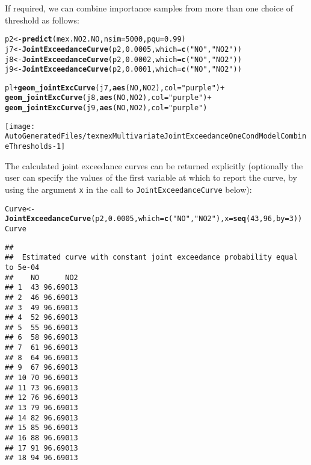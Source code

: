 \documentclass[10pt]{article}\usepackage[]{graphicx}\usepackage[]{color}
\makeatletter
\def\maxwidth{ %
  \ifdim\Gin@nat@width>\linewidth
    \linewidth
  \else
    \Gin@nat@width
  \fi
}
\newcommand{\hlnum}[1]{\textcolor[rgb]{0.686,0.059,0.569}{#1}}%
\newcommand{\hlstr}[1]{\textcolor[rgb]{0.192,0.494,0.8}{#1}}%
\newcommand{\hlopt}[1]{\textcolor[rgb]{0,0,0}{#1}}%
\newcommand{\hlstd}[1]{\textcolor[rgb]{0.345,0.345,0.345}{#1}}%
\newcommand{\hlkwb}[1]{\textcolor[rgb]{0.69,0.353,0.396}{#1}}%
\newcommand{\hlkwc}[1]{\textcolor[rgb]{0.333,0.667,0.333}{#1}}%
\newcommand{\hlkwd}[1]{\textcolor[rgb]{0.737,0.353,0.396}{\textbf{#1}}}%
\newenvironment{kframe}{%
 \def\at@end@of@kframe{}%
 \ifinner\ifhmode%
  \def\at@end@of@kframe{\end{minipage}}%
  \begin{minipage}{\columnwidth}%
 \fi\fi%
 \def\FrameCommand##1{\hskip\@totalleftmargin \hskip-\fboxsep
 \colorbox{shadecolor}{##1}\hskip-\fboxsep
     \hskip-\linewidth \hskip-\@totalleftmargin \hskip\columnwidth}%
 \MakeFramed {\advance\hsize-\width
   \@totalleftmargin\z@ \linewidth\hsize
   \@setminipage}}%
 {\par\unskip\endMakeFramed%
 \at@end@of@kframe}
\newenvironment{knitrout}{}{} %
\makeatother
\begin{document}
If required, we can combine importance samples from more than one choice of threshold as follows:

\begin{knitrout}
\color{fgcolor}\begin{kframe}
\begin{alltt}
\hlstd{p2} \hlkwb{<-} \hlkwd{predict}\hlstd{(mex.NO2.NO,}\hlkwc{nsim}\hlstd{=}\hlnum{5000}\hlstd{,}\hlkwc{pqu}\hlstd{=}\hlnum{0.99}\hlstd{)}
\hlstd{j7} \hlkwb{<-} \hlkwd{JointExceedanceCurve}\hlstd{(p2,}\hlnum{0.0005}\hlstd{,}\hlkwc{which}\hlstd{=}\hlkwd{c}\hlstd{(}\hlstr{"NO"}\hlstd{,}\hlstr{"NO2"}\hlstd{))}
\hlstd{j8} \hlkwb{<-} \hlkwd{JointExceedanceCurve}\hlstd{(p2,}\hlnum{0.0002}\hlstd{,}\hlkwc{which}\hlstd{=}\hlkwd{c}\hlstd{(}\hlstr{"NO"}\hlstd{,}\hlstr{"NO2"}\hlstd{))}
\hlstd{j9} \hlkwb{<-} \hlkwd{JointExceedanceCurve}\hlstd{(p2,}\hlnum{0.0001}\hlstd{,}\hlkwc{which}\hlstd{=}\hlkwd{c}\hlstd{(}\hlstr{"NO"}\hlstd{,}\hlstr{"NO2"}\hlstd{))}

\hlstd{pl} \hlopt{+} \hlkwd{geom_jointExcCurve}\hlstd{(j7,}\hlkwd{aes}\hlstd{(NO,NO2),}\hlkwc{col}\hlstd{=}\hlstr{"purple"}\hlstd{)} \hlopt{+}
    \hlkwd{geom_jointExcCurve}\hlstd{(j8,}\hlkwd{aes}\hlstd{(NO,NO2),}\hlkwc{col}\hlstd{=}\hlstr{"purple"}\hlstd{)} \hlopt{+}
    \hlkwd{geom_jointExcCurve}\hlstd{(j9,}\hlkwd{aes}\hlstd{(NO,NO2),}\hlkwc{col}\hlstd{=}\hlstr{"purple"}\hlstd{)}
\end{alltt}
\end{kframe}
\texttt{[image: AutoGeneratedFiles/texmexMultivariateJointExceedanceOneCondModelCombineThresholds-1]} 

\end{knitrout}

The calculated joint exceedance curves can be returned explicitly (optionally the user can specify the values of the first variable at which to report the curve, by using the argument {\tt x} in the call to {\tt JointExceedanceCurve} below):

\begin{knitrout}
\color{fgcolor}\begin{kframe}
\begin{alltt}
\hlstd{Curve} \hlkwb{<-} \hlkwd{JointExceedanceCurve}\hlstd{(p2,}\hlnum{0.0005}\hlstd{,}\hlkwc{which}\hlstd{=}\hlkwd{c}\hlstd{(}\hlstr{"NO"}\hlstd{,}\hlstr{"NO2"}\hlstd{),}\hlkwc{x}\hlstd{=}\hlkwd{seq}\hlstd{(}\hlnum{43}\hlstd{,}\hlnum{96}\hlstd{,}\hlkwc{by}\hlstd{=}\hlnum{3}\hlstd{))}
\hlstd{Curve}
\end{alltt}
\begin{verbatim}
## 
##  Estimated curve with constant joint exceedance probability equal to 5e-04 
##    NO      NO2
## 1  43 96.69013
## 2  46 96.69013
## 3  49 96.69013
## 4  52 96.69013
## 5  55 96.69013
## 6  58 96.69013
## 7  61 96.69013
## 8  64 96.69013
## 9  67 96.69013
## 10 70 96.69013
## 11 73 96.69013
## 12 76 96.69013
## 13 79 96.69013
## 14 82 96.69013
## 15 85 96.69013
## 16 88 96.69013
## 17 91 96.69013
## 18 94 96.69013
\end{verbatim}
\end{kframe}
\end{knitrout}
\end{document}
